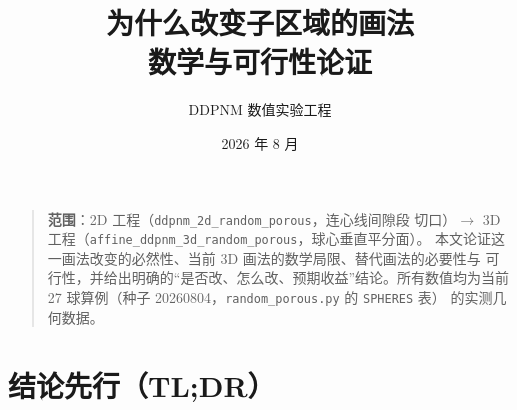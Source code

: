 \documentclass[11pt]{ctexart}
\title{\textbf{为什么改变子区域的画法\\ 数学与可行性论证}}
\author{DDPNM 数值实验工程}
\date{2026 年 8 月}
\begin{document}
\maketitle

\begin{quotation}
\noindent\textbf{范围}：2D 工程（\texttt{ddpnm\_2d\_random\_porous}，连心线间隙段
切口）$\rightarrow$ 3D 工程（\texttt{affine\_ddpnm\_3d\_random\_porous}，球心垂直平分面）。
本文论证这一画法改变的必然性、当前 3D 画法的数学局限、替代画法的必要性与
可行性，并给出明确的``是否改、怎么改、预期收益''结论。所有数值均为当前
27 球算例（种子 20260804，\texttt{random\_porous.py} 的 \texttt{SPHERES} 表）
的实测几何数据。
\end{quotation}

\section{结论先行（TL;DR）}
\end{document}
